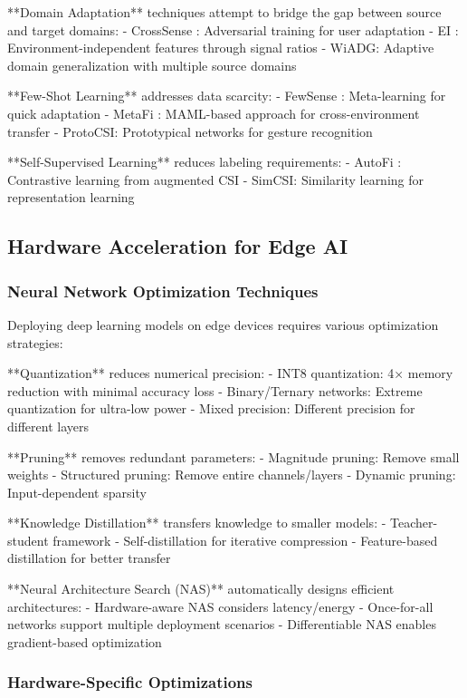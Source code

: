 \documentclass[10pt,journal,compsoc]{IEEEtran}
\begin{document}
**Domain Adaptation** techniques attempt to bridge the gap between source and target domains:
- CrossSense \cite{crosssense2018}: Adversarial training for user adaptation
- EI \cite{ei2020}: Environment-independent features through signal ratios
- WiADG: Adaptive domain generalization with multiple source domains

**Few-Shot Learning** addresses data scarcity:
- FewSense \cite{fewsense2022}: Meta-learning for quick adaptation
- MetaFi \cite{metafi2021}: MAML-based approach for cross-environment transfer
- ProtoCSI: Prototypical networks for gesture recognition

**Self-Supervised Learning** reduces labeling requirements:
- AutoFi \cite{autofi2022}: Contrastive learning from augmented CSI
- SimCSI: Similarity learning for representation learning

\subsection{Hardware Acceleration for Edge AI}

\subsubsection{Neural Network Optimization Techniques}

Deploying deep learning models on edge devices requires various optimization strategies:

**Quantization** reduces numerical precision:
- INT8 quantization: 4× memory reduction with minimal accuracy loss
- Binary/Ternary networks: Extreme quantization for ultra-low power
- Mixed precision: Different precision for different layers

**Pruning** removes redundant parameters:
- Magnitude pruning: Remove small weights
- Structured pruning: Remove entire channels/layers
- Dynamic pruning: Input-dependent sparsity

**Knowledge Distillation** transfers knowledge to smaller models:
- Teacher-student framework
- Self-distillation for iterative compression
- Feature-based distillation for better transfer

**Neural Architecture Search (NAS)** automatically designs efficient architectures:
- Hardware-aware NAS considers latency/energy
- Once-for-all networks support multiple deployment scenarios
- Differentiable NAS enables gradient-based optimization

\subsubsection{Hardware-Specific Optimizations}
\end{document}
